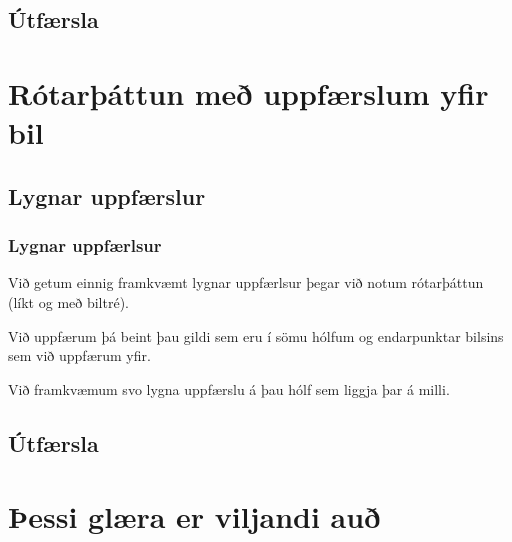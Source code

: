 \subsection{Útfærsla}
{
}

\section{Rótarþáttun með uppfærslum yfir bil}
\subsection{Lygnar uppfærslur}
{
	\frametitle{Lygnar uppfærlsur}
	{
		\item<1-> Við getum einnig framkvæmt lygnar uppfærlsur þegar við notum rótarþáttun (líkt og með biltré).
		\item<2-> Við uppfærum þá beint þau gildi sem eru í sömu hólfum og endarpunktar bilsins sem við uppfærum yfir.
		\item<3-> Við framkvæmum svo lygna uppfærslu á þau hólf sem liggja þar á milli.
	}
}

\subsection{Útfærsla}
{
}

\section{Þessi glæra er viljandi auð}
{
}


